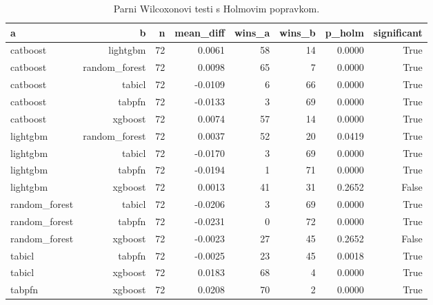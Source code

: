 \begin{table}[htbp]
\centering
\caption{Parni Wilcoxonovi testi s Holmovim popravkom.}
\label{tab:wilcoxon}
\begin{tabular}{lrrrrrrr}
\hline
a & b & n & mean\_diff & wins\_a & wins\_b & p\_holm & significant \\
\hline
catboost & lightgbm & 72 & 0.0061 & 58 & 14 & 0.0000 & True \\
catboost & random\_forest & 72 & 0.0098 & 65 & 7 & 0.0000 & True \\
catboost & tabicl & 72 & -0.0109 & 6 & 66 & 0.0000 & True \\
catboost & tabpfn & 72 & -0.0133 & 3 & 69 & 0.0000 & True \\
catboost & xgboost & 72 & 0.0074 & 57 & 14 & 0.0000 & True \\
lightgbm & random\_forest & 72 & 0.0037 & 52 & 20 & 0.0419 & True \\
lightgbm & tabicl & 72 & -0.0170 & 3 & 69 & 0.0000 & True \\
lightgbm & tabpfn & 72 & -0.0194 & 1 & 71 & 0.0000 & True \\
lightgbm & xgboost & 72 & 0.0013 & 41 & 31 & 0.2652 & False \\
random\_forest & tabicl & 72 & -0.0206 & 3 & 69 & 0.0000 & True \\
random\_forest & tabpfn & 72 & -0.0231 & 0 & 72 & 0.0000 & True \\
random\_forest & xgboost & 72 & -0.0023 & 27 & 45 & 0.2652 & False \\
tabicl & tabpfn & 72 & -0.0025 & 23 & 45 & 0.0018 & True \\
tabicl & xgboost & 72 & 0.0183 & 68 & 4 & 0.0000 & True \\
tabpfn & xgboost & 72 & 0.0208 & 70 & 2 & 0.0000 & True \\
\hline
\end{tabular}
\end{table}
